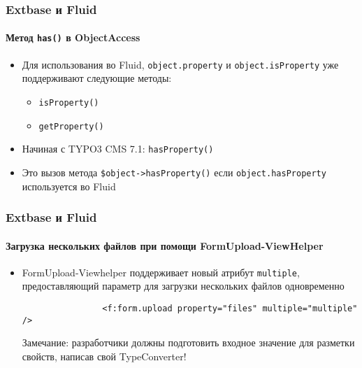 \begin{frame}[fragile]
	\frametitle{Extbase и Fluid}
	\framesubtitle{Метод \texttt{has()} в ObjectAccess}

	\begin{itemize}

		\item Для использования во Fluid, \texttt{object.property} и \texttt{object.isProperty} уже
			поддерживают следующие методы:

			\begin{itemize}
				\item \texttt{isProperty()}
				\item \texttt{getProperty()}
			\end{itemize}

		\item Начиная с TYPO3 CMS 7.1: \texttt{hasProperty()}
		\item Это вызов метода \texttt{\$object->hasProperty()}\newline
			если \texttt{object.hasProperty} используется во Fluid

	\end{itemize}

\end{frame}


\begin{frame}[fragile]
	\frametitle{Extbase и Fluid}
	\framesubtitle{Загрузка нескольких файлов при помощи FormUpload-ViewHelper}

	\begin{itemize}

		\item FormUpload-Viewhelper поддерживает новый атрибут \texttt{multiple}, предоставляющий
			параметр для загрузки нескольких файлов одновременно

			\begin{lstlisting}
				<f:form.upload property="files" multiple="multiple" />
			\end{lstlisting}

			\vspace{0.2cm}

			\begingroup
				\color{red}
					Замечание: разработчики должны подготовить входное значение для разметки свойств, написав 
					свой TypeConverter!
			\endgroup

	\end{itemize}

\end{frame}

